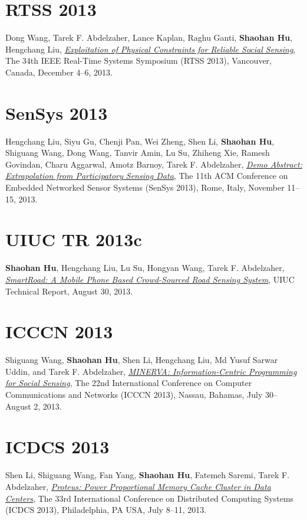 \section{\sc RTSS 2013}\hypertarget{wang2013rtss}{} Dong Wang, Tarek F. Abdelzaher, Lance Kaplan, Raghu Ganti, \textbf{Shaohan Hu}, Hengchang Liu, \href{http://ieeexplore.ieee.org/xpl/articleDetails.jsp?arnumber=6728876}{\emph{Exploitation of Physical Constraints for Reliable Social Sensing}}, \textsf{The 34th IEEE Real-Time Systems Symposium (RTSS 2013)}, Vancouver, Canada, December 4--6, 2013.

\section{\sc SenSys 2013}\hypertarget{liu2013sensys}{} Hengchang Liu, Siyu Gu, Chenji Pan, Wei Zheng, Shen Li, \textbf{Shaohan Hu}, Shiguang Wang, Dong Wang, Tanvir Amin, Lu Su, Zhiheng Xie, Ramesh Govindan, Charu Aggarwal, Amotz Barnoy, Tarek F. Abdelzaher, \href{http://portal.acm.org/citation.cfm?id=2517431}{\emph{Demo Abstract: Extrapolation from Participatory Sensing Data}}, \textsf{The 11th ACM Conference on Embedded Networked Sensor Systems (SenSys 2013)}, Rome, Italy, November 11--15, 2013.

\section{\sc UIUC TR 2013c}\hypertarget{hu2013uiuc2}{} \textbf{Shaohan Hu}, Hengchang Liu, Lu Su, Hongyan Wang, Tarek F. Abdelzaher, \href{https://www.ideals.illinois.edu/handle/2142/45699}{\emph{SmartRoad: A Mobile Phone Based Crowd-Sourced Road Sensing System}}, \textsf{UIUC Technical Report}, August 30, 2013.

\section{\sc ICCCN 2013}\hypertarget{wang2013icccn}{} Shiguang Wang, \textbf{Shaohan Hu}, Shen Li, Hengchang Liu, Md Yusuf Sarwar Uddin, and Tarek F. Abdelzaher, \href{http://ieeexplore.ieee.org/xpls/abs_all.jsp?arnumber=6614152}{\emph{MINERVA: Information-Centric Programming for Social Sensing}}, \textsf{The 22nd International Conference on Computer Communications and Networks (ICCCN 2013)}, Nassau, Bahamas, July 30--August 2, 2013.

\section{\sc ICDCS 2013}\hypertarget{li2013icdcs}{} Shen Li, Shiguang Wang, Fan Yang, \textbf{Shaohan Hu}, Fatemeh Saremi, Tarek F. Abdelzaher, \href{http://ieeexplore.ieee.org/xpl/articleDetails.jsp?arnumber=6681577}{\emph{Proteus: Power Proportional Memory Cache Cluster in Data Centers}}, \textsf{The 33rd International Conference on Distributed Computing Systems (ICDCS 2013)}, Philadelphia, PA USA, July 8--11, 2013.

